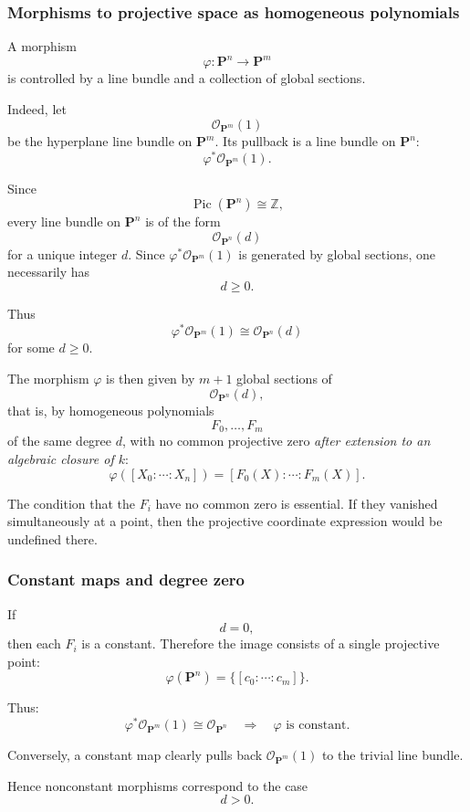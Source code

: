 \subsubsection{Morphisms to projective space as homogeneous polynomials}

A morphism
\[
\varphi:\mathbf{P}^n\longrightarrow\mathbf{P}^m
\]
is controlled by a line bundle and a collection of global sections.

Indeed, let
\[
\mathcal{O}_{\mathbf{P}^m}(1)
\]
be the hyperplane line bundle on \(\mathbf{P}^m\). Its pullback is a line bundle on \(\mathbf{P}^n\):
\[
\varphi^*\mathcal{O}_{\mathbf{P}^m}(1).
\]

Since
\[
\operatorname{Pic}(\mathbf{P}^n)\cong\mathbb{Z},
\]
every line bundle on \(\mathbf{P}^n\) is of the form
\[
\mathcal{O}_{\mathbf{P}^n}(d)
\]
for a unique integer \(d\). Since \(\varphi^*\mathcal{O}_{\mathbf{P}^m}(1)\) is generated by global sections, one necessarily has
\[
d\geq 0.
\]

Thus
\[
\varphi^*\mathcal{O}_{\mathbf{P}^m}(1)\cong \mathcal{O}_{\mathbf{P}^n}(d)
\]
for some \(d\geq 0\).

The morphism \(\varphi\) is then given by \(m+1\) global sections of
\[
\mathcal{O}_{\mathbf{P}^n}(d),
\]
that is, by homogeneous polynomials
\[
F_0,\dots,F_m
\]
of the same degree \(d\), with no common projective zero
\emph{after extension to an algebraic closure of \(k\)}:
\[
\varphi([X_0:\cdots:X_n])
=
[F_0(X):\cdots:F_m(X)].
\]

The condition that the \(F_i\) have no common zero is essential. If they vanished simultaneously at a point, then the projective coordinate expression would be undefined there.

\subsubsection{Constant maps and degree zero}

If
\[
d=0,
\]
then each \(F_i\) is a constant. Therefore the image consists of a single projective point:
\[
\varphi(\mathbf{P}^n)=\{[c_0:\cdots:c_m]\}.
\]

Thus:
\[
\boxed{
	\varphi^*\mathcal{O}_{\mathbf{P}^m}(1)\cong \mathcal{O}_{\mathbf{P}^n}
	\quad\Longrightarrow\quad
	\varphi\text{ is constant.}
}
\]

Conversely, a constant map clearly pulls back \(\mathcal{O}_{\mathbf{P}^m}(1)\) to the trivial line bundle.

Hence nonconstant morphisms correspond to the case
\[
d>0.
\]

